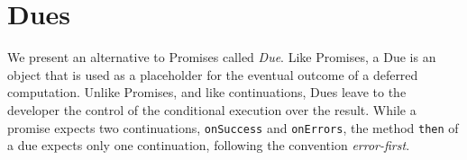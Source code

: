 


\section{Dues} \label{section:due}

We present an alternative to Promises called \textit{Due}.
Like Promises, a Due is an object that is used as a placeholder for the eventual outcome of a deferred computation.
Unlike Promises, and like continuations, Dues leave to the developer the control of the conditional execution over the result.
While a promise expects two continuations, \texttt{onSuccess} and \texttt{onErrors}, the method \texttt{then} of a due expects only one continuation, following the convention \textit{error-first}.

